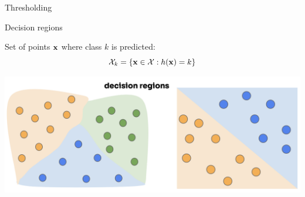 \documentclass[11pt,compress,t,notes=noshow, xcolor=table]{beamer}
\begin{document}
\begin{frame}{Thresholding}

\end{frame} 

\begin{vbframe}{Decision regions}

Set of points $\mathbf{x}$ where class $k$ is predicted:
$$
\mathcal{X}_k = \{\mathbf{x} \in \mathcal{X} : h(\mathbf{x}) = k\}
$$

\begin{center}
  \includegraphics{figure_man/decision_regions.png} 
\end{center}
\end{vbframe} 
\end{document}
